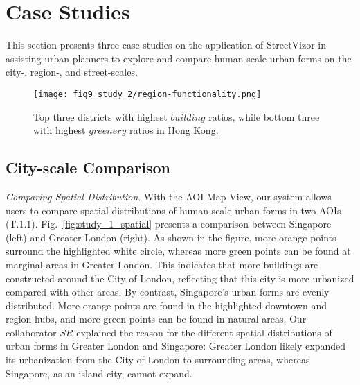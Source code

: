 \section{Case Studies}

This section presents three case studies on the application of StreetVizor in assisting urban planners to explore and compare human-scale urban forms on the city-, region-, and street-scales.


\begin{figure}[t]
	\centering
	\texttt{[image: fig9\_study\_2/region-functionality.png]}
	\vspace{-5mm}
	\caption{Top three districts with highest $building$ ratios, while bottom three with highest $greenery$ ratios in Hong Kong.}
	\label{fig:region-funcitonality}
	\vspace{-4mm}
\end{figure}

\subsection{City-scale Comparison}

\textit{Comparing Spatial Distribution}.
With the AOI Map View, our system allows users to compare spatial distributions of human-scale urban forms in two AOIs (T.1.1).
Fig.~\ref{fig:study_1_spatial} presents a comparison between Singapore (left) and Greater London (right).
As shown in the figure, more orange points surround the highlighted white circle, whereas more green points can be found at marginal areas in Greater London.
This indicates that more buildings are constructed around the City of London, reflecting that this city is more urbanized compared with other areas.
By contrast, Singapore's urban forms are evenly distributed.
More orange points are found in the highlighted downtown and region hubs, and more green points can be found in natural areas.
Our collaborator $SR$ explained the reason for the different spatial distributions of urban forms in Greater London and Singapore: Greater London likely expanded its urbanization from the City of London to surrounding areas, whereas Singapore, as an island city, cannot expand.


